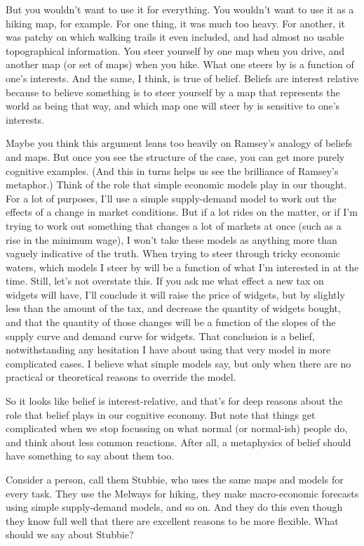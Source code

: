 \documentclass[11pt,]{book}
\begin{document}
But you wouldn't want to use it for everything. You wouldn't want to use it as a hiking map, for example. For one thing, it was much too heavy. For another, it was patchy on which walking trails it even included, and had almost no usable topographical information. You steer yourself by one map when you drive, and another map (or set of maps) when you hike. What one steers by is a function of one's interests. And the same, I think, is true of belief. Beliefs are interest relative because to believe something is to steer yourself by a map that represents the world as being that way, and which map one will steer by is sensitive to one's interests.

Maybe you think this argument leans too heavily on Ramsey's analogy of beliefs and maps. But once you see the structure of the case, you can get more purely cognitive examples. (And this in turns helps us see the brilliance of Ramsey's metaphor.) Think of the role that simple economic models play in our thought. For a lot of purposes, I'll use a simple supply-demand model to work out the effects of a change in market conditions. But if a lot rides on the matter, or if I'm trying to work out something that changes a lot of markets at once (such as a rise in the minimum wage), I won't take these models as anything more than vaguely indicative of the truth. When trying to steer through tricky economic waters, which models I steer by will be a function of what I'm interested in at the time. Still, let's not overstate this. If you ask me what effect a new tax on widgets will have, I'll conclude it will raise the price of widgets, but by slightly less than the amount of the tax, and decrease the quantity of widgets bought, and that the quantity of those changes will be a function of the slopes of the supply curve and demand curve for widgets. That conclusion is a belief, notwithstanding any hesitation I have about using that very model in more complicated cases. I believe what simple models say, but only when there are no practical or theoretical reasons to override the model.

So it looks like belief is interest-relative, and that's for deep reasons about the role that belief plays in our cognitive economy. But note that things get complicated when we stop focussing on what normal (or normal-ish) people do, and think about less common reactions. After all, a metaphysics of belief should have something to say about them too.

Consider a person, call them Stubbie, who uses the same maps and models for every task. They use the Melways for hiking, they make macro-economic forecasts using simple supply-demand models, and so on. And they do this even though they know full well that there are excellent reasons to be more flexible. What should we say about Stubbie?
\end{document}
